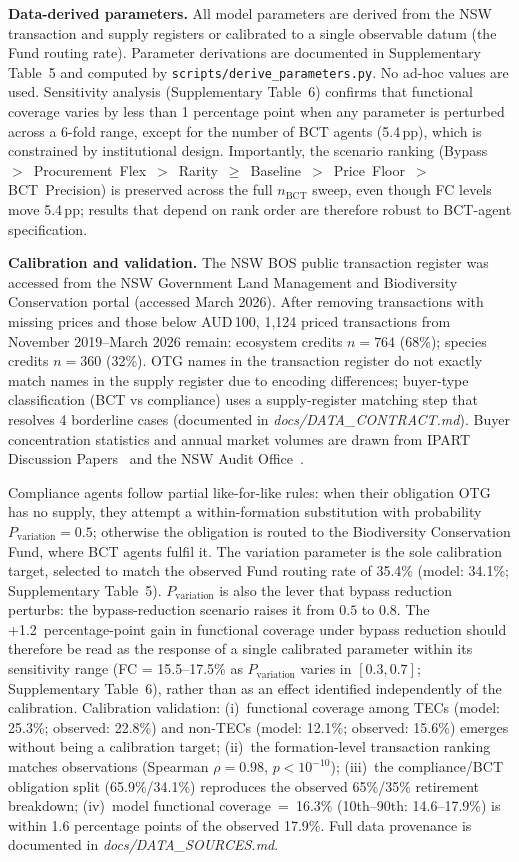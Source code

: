 \documentclass[pdflatex,sn-nature,oneside]{sn-jnl}
\begin{document}
\textbf{Data-derived parameters.}
All model parameters are derived from the NSW transaction and supply registers or
calibrated to a single observable datum (the Fund routing rate).
Parameter derivations are documented in Supplementary Table~5 and computed by
\texttt{scripts/derive\_parameters.py}.
No ad-hoc values are used.
Sensitivity analysis (Supplementary Table~6) confirms that functional coverage varies by less
than 1 percentage point when any parameter is perturbed across a 6-fold range,
except for the number of BCT agents (5.4\,pp), which is constrained by
institutional design. Importantly, the scenario ranking
(Bypass~$>$~Procurement~Flex~$>$~Rarity~$\geq$~Baseline~$>$~Price~Floor~$>$
BCT~Precision) is preserved across the full $n_{\text{BCT}}$ sweep, even
though FC levels move 5.4\,pp; results that depend on rank order are
therefore robust to BCT-agent specification.

\textbf{Calibration and validation.}
The NSW BOS public transaction register was accessed from the NSW Government Land
Management and Biodiversity Conservation portal (accessed March 2026).
After removing transactions with missing prices and those below AUD\,100, 1,124
priced transactions from November 2019--March 2026 remain: ecosystem credits
$n = 764$ (68\%); species credits $n = 360$ (32\%).
OTG names in the transaction register do not exactly match names in
the supply register due to encoding differences; buyer-type
classification (BCT vs compliance) uses a supply-register matching
step that resolves 4 borderline cases (documented in
\emph{docs/DATA\_CONTRACT.md}).
Buyer concentration statistics and annual market volumes are drawn from IPART
Discussion Papers~\cite{IPART2024} and the NSW Audit
Office~\cite{NSWAuditOffice2022}.

Compliance agents follow partial like-for-like rules: when their obligation OTG
has no supply, they attempt a within-formation substitution with probability
$P_{\text{variation}} = 0.5$; otherwise the obligation is routed to the
Biodiversity Conservation Fund, where BCT agents fulfil it.
The variation parameter is the sole calibration target, selected to match
the observed Fund routing rate of 35.4\%
(model: 34.1\%; Supplementary Table~5).
$P_{\text{variation}}$ is also the lever that bypass reduction perturbs:
the bypass-reduction scenario raises it from $0.5$ to $0.8$. The
+1.2~percentage-point gain in functional coverage under bypass reduction
should therefore be read as the response of a single calibrated parameter
within its sensitivity range (FC = 15.5--17.5\% as $P_{\text{variation}}$
varies in $[0.3, 0.7]$; Supplementary Table~6), rather than as an effect
identified independently of the calibration.
Calibration validation: (i)~functional coverage among TECs (model: 25.3\%; observed: 22.8\%)
and non-TECs (model: 12.1\%; observed: 15.6\%) emerges without being a calibration target;
(ii)~the formation-level transaction ranking matches observations
(Spearman $\rho = 0.98$, $p < 10^{-10}$);
(iii)~the compliance/BCT obligation split (65.9\%/34.1\%) reproduces
the observed 65\%/35\% retirement breakdown;
(iv)~model functional coverage~=~16.3\% (10th--90th: 14.6--17.9\%) is within 1.6 percentage
points of the observed 17.9\%.
Full data provenance is documented in \emph{docs/DATA\_SOURCES.md}.
\end{document}
